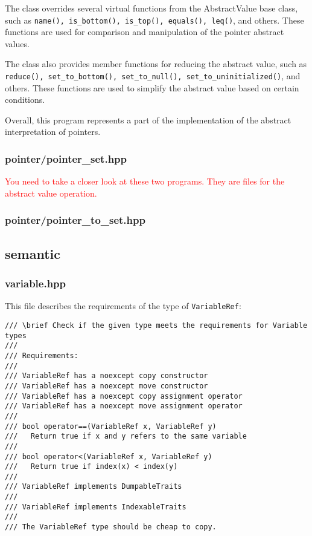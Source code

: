 \documentclass[12pt]{article}
\begin{document}
The class overrides several virtual functions from the AbstractValue base class, such as \texttt{name(), is\_bottom(), is\_top(), equals(), leq()}, and others. These functions are used for comparison and manipulation of the pointer abstract values.

The class also provides member functions for reducing the abstract value, such as \texttt{reduce(), set\_to\_bottom(), set\_to\_null(), set\_to\_uninitialized()}, and others. These functions are used to simplify the abstract value based on certain conditions.

Overall, this program represents a part of the implementation of the abstract interpretation of pointers.

\subsubsection{pointer/pointer\_set.hpp}
\textcolor{red}{You need to take a closer look at these two programs. They are files for the abstract value operation.}
\subsubsection{pointer/pointer\_to\_set.hpp}

\subsection{semantic}
\subsubsection{variable.hpp}
This file describes the requirements of the type of \texttt{VariableRef}:
\begin{lstlisting}
/// \brief Check if the given type meets the requirements for Variable types
///
/// Requirements:
///
/// VariableRef has a noexcept copy constructor
/// VariableRef has a noexcept move constructor
/// VariableRef has a noexcept copy assignment operator
/// VariableRef has a noexcept move assignment operator
///
/// bool operator==(VariableRef x, VariableRef y)
///   Return true if x and y refers to the same variable
///
/// bool operator<(VariableRef x, VariableRef y)
///   Return true if index(x) < index(y)
///
/// VariableRef implements DumpableTraits
///
/// VariableRef implements IndexableTraits
///
/// The VariableRef type should be cheap to copy.
\end{lstlisting}
\end{document}
